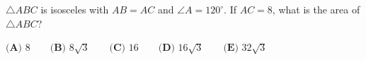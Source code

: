 $\triangle ABC$ is isosceles with $AB=AC$ and $\angle A=120^\circ$. If $AC=8$, what is the area of $\triangle ABC$?

$\textbf{(A) }8\qquad\textbf{(B) }8\sqrt3\qquad\textbf{(C) }16\qquad\textbf{(D) }16\sqrt3\qquad\textbf{(E) }32\sqrt3$
